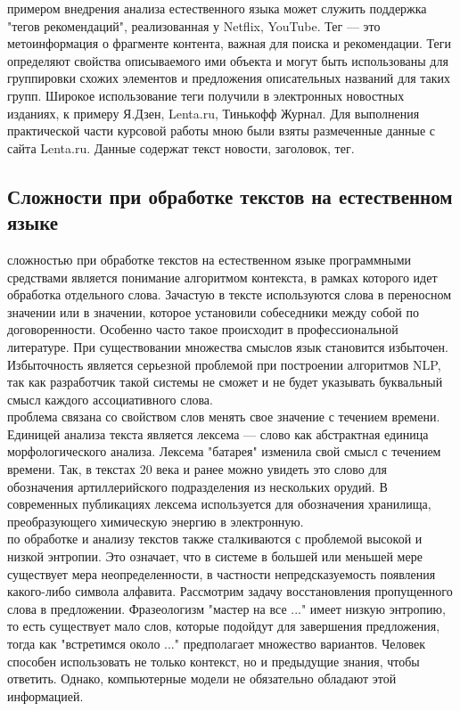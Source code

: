 \documentclass{article}
\newcommand\tab[1][1cm]{\hspace*{#1}}
\begin{document}
 примером внедрения анализа естественного языка может служить поддержка "тегов рекомендаций", реализованная у Netflix, YouTube. Тег — это метоинформация о фрагменте контента, важная для поиска и рекомендации. Теги определяют свойства описываемого ими объекта и могут быть использованы для группировки схожих элементов и предложения описательных названий для таких групп. Широкое использование теги получили в электронных новостных изданиях, к примеру Я.Дзен, Lenta.ru, Тинькофф Журнал. Для выполнения практической части курсовой работы мною были взяты размеченные данные с сайта Lenta.ru. Данные содержат текст новости, заголовок, тег.\\
\subsection{Сложности при обработке текстов на естественном языке}
 сложностью при обработке текстов на естественном языке программными средствами является понимание алгоритмом контекста, в рамках которого идет обработка отдельного слова. Зачастую в тексте используются слова в переносном значении или в значении, которое установили собеседники между собой по договоренности. Особенно часто такое происходит в профессиональной литературе. При существовании множества смыслов язык становится избыточен. Избыточность является серьезной проблемой при построении алгоритмов NLP, так как разработчик такой системы не сможет и не будет указывать буквальный смысл каждого ассоциативного слова.  \\
 проблема связана со свойством слов менять свое значение с течением времени. Единицей анализа текста является лексема — слово как абстрактная единица морфологического анализа. Лексема "батарея" изменила свой смысл с течением времени. Так, в текстах 20 века и ранее можно увидеть это слово для обозначения артиллерийского подразделения из нескольких орудий. В современных публикациях лексема используется для обозначения хранилища, преобразующего химическую энергию в электронную.\\
 по обработке и анализу текстов также сталкиваются с проблемой высокой и низкой энтропии. Это означает, что в системе в большей или меньшей мере существует мера неопределенности, в частности непредсказуемость появления какого-либо символа алфавита. Рассмотрим задачу восстановления пропущенного слова в предложении. Фразеологизм "мастер на все ..." имеет низкую энтропию, то есть существует мало слов, которые подойдут для завершения предложения, тогда как "встретимся около ..." предполагает множество вариантов. Человек способен использовать не только контекст, но и предыдущие знания, чтобы ответить. Однако, компьютерные модели не обязательно обладают этой информацией.\\
\end{document}
